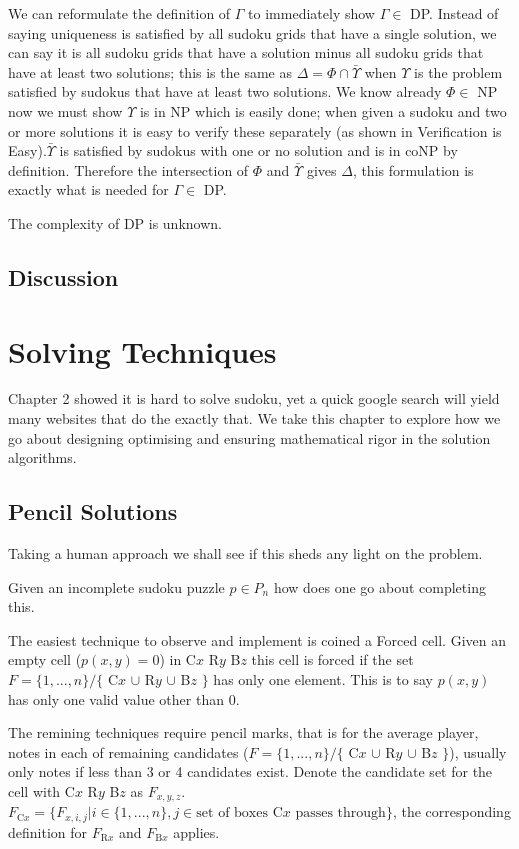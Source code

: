 \documentclass[a4paper,11pt]{report}
\begin{document}
We can reformulate the definition of $\Gamma$ to immediately show $\Gamma\in$ DP. Instead of saying uniqueness is satisfied by all sudoku grids that have a single solution, we can say it is all sudoku grids that have a solution minus all sudoku grids that have at least two solutions; this is the same as $\Delta = \Phi \cap \bar{\Upsilon}$ when $\Upsilon$ is the problem satisfied by sudokus that have at least two solutions. We know already $\Phi\in$ NP now we must show $\Upsilon$ is in NP which is easily done; when given a sudoku and two or more solutions it is easy to verify these separately (as shown in Verification is Easy).$\bar{\Upsilon}$ is satisfied by sudokus with one or no solution and is in coNP by definition. Therefore the intersection of $\Phi$ and $\bar{\Upsilon}$ gives $\Delta$, this formulation is exactly what is needed for $\Gamma\in$ DP.

The complexity of DP is unknown\cite{dphardness}. 

\section{Discussion}
		

\chapter{Solving Techniques}
Chapter 2 showed it is hard to solve sudoku, yet a quick google search will yield many websites that do the exactly that. We take this chapter to explore how we go about designing optimising and ensuring mathematical rigor in the solution algorithms.
\section{Pencil Solutions}
Taking a human approach we shall see if this sheds any light on the problem.

Given an incomplete sudoku puzzle $p\in P_n$ how does one go about completing this.

The easiest technique to observe and implement is coined a Forced cell. Given an empty cell ($p(x,y)=0$) in C$x$ R$y$ B$z$ this cell is forced if the set $F=\{1,...,n\} / \{$ C$x$ $\cup$ R$y$ $\cup$ B$z$ $\}$ has only one element. This is to say $p(x,y)$ has only one valid value other than 0. 

The remining techniques require pencil marks, that is for the average player, notes in each of remaining candidates ($F=\{1,...,n\} / \{$ C$x$ $\cup$ R$y$ $\cup$ B$z$ $\}$), usually only notes if less than 3 or 4 candidates exist. Denote the candidate set for the cell with C$x$ R$y$ B$z$ as $F_{x,y,z}$. $F_{\text{C}x} = \{F_{x,i,j}|i\in\{1,...,n\}, j \in \text{set of boxes C$x$ passes through}\}$, the corresponding definition for $F_{\text{R}x}$ and $F_{\text{B}x}$ applies.
\end{document}

